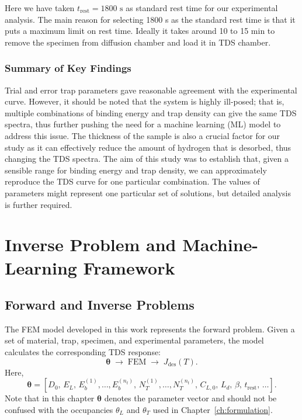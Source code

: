 \documentclass[a4paper,12pt,oneside]{report}
\begin{document}
Here we have taken $t_{\mathrm{rest}} = 1800 \text{ s}$ as standard rest time for our experimental analysis. The main reason for selecting 1800 s as the standard rest time is that it puts a maximum limit on rest time. Ideally it takes around 10 to 15 min to remove the specimen from diffusion chamber and load it in TDS chamber. 
\subsection{Summary of Key Findings}

Trial and error trap parameters gave reasonable agreement with the experimental curve. However, it should be noted that the system is highly ill-posed; that is, multiple combinations of binding energy and trap density can give the same TDS spectra, thus further pushing the need for a machine learning (ML) model to address this issue. The thickness of the sample is also a crucial factor for our study as it can effectively reduce the amount of hydrogen that is desorbed, thus changing the TDS spectra. The aim of this study was to establish that, given a sensible range for binding energy and trap density, we can approximately reproduce the TDS curve for one particular combination. The values of parameters might represent one particular set of solutions, but detailed analysis is further required.

\chapter{Inverse Problem and Machine-Learning Framework}
\label{ch:inverse}

\section{Forward and Inverse Problems}
\label{sec:fwd-inv}

The FEM model developed in this work represents the forward problem. Given a set of material, trap, specimen, and experimental parameters, the model calculates the corresponding TDS response:
\begin{equation}
  \boldsymbol{\theta} \;\longrightarrow\; \text{FEM} \;\longrightarrow\; J_{\mathrm{des}}(T).
  \label{eq:forward}
\end{equation}
Here,
\begin{equation}
  \boldsymbol{\theta} = \left[ D_0,\, E_L,\, E_b^{(1)},\dots,E_b^{(n_t)},\,
  N_T^{(1)},\dots,N_T^{(n_t)},\, C_{L,0},\, L_d,\, \beta,\, t_{\mathrm{rest}},\, \dots \right].
  \label{eq:theta}
\end{equation}
Note that in this chapter $\boldsymbol{\theta}$ denotes the parameter vector and should not be confused with the occupancies $\theta_L$ and $\theta_T$ used in Chapter~\ref{ch:formulation}.
\end{document}
